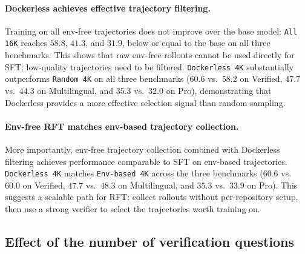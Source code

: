 \documentclass{llmxive}
\providecommand{\approach}{Dockerless\xspace}
\providecommand{\arraystretch}{1.08}
\begin{document}
\paragraph{\approach achieves effective trajectory filtering.}
Training on all env-free trajectories does not improve over the base model: \texttt{All 16K} reaches $58.8$, $41.3$, and $31.9$, below or equal to the base on all three benchmarks.
This shows that raw env-free rollouts cannot be used directly for SFT; low-quality trajectories need to be filtered.
\texttt{\approach 4K} substantially outperforms \texttt{Random 4K} on all three benchmarks ($60.6$ vs.\ $58.2$ on Verified, $47.7$ vs.\ $44.3$ on Multilingual, and $35.3$ vs.\ $32.0$ on Pro), 
demonstrating that \approach provides a more effective selection signal than random sampling.

\paragraph{Env-free RFT matches env-based trajectory collection.}
More importantly, env-free trajectory collection combined with \approach filtering achieves performance comparable to SFT on env-based trajectories.
\texttt{\approach 4K} matches \texttt{Env-based 4K} across the three benchmarks ($60.6$ vs.\ $60.0$ on Verified, $47.7$ vs.\ $48.3$ on Multilingual, and $35.3$ vs.\ $33.9$ on Pro).
This suggests a scalable path for RFT: collect rollouts without per-repository setup, then use a strong verifier to select the trajectories worth training on.

\subsection{Effect of the number of verification questions}
\label{sec:question-ablation}
\end{document}
